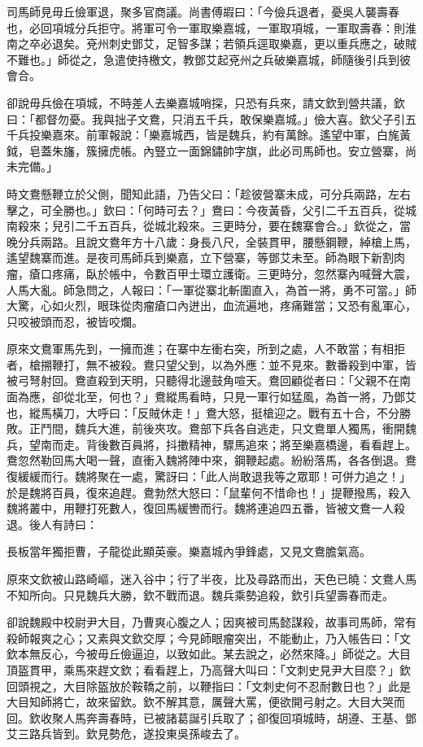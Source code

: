 司馬師見毋丘儉軍退，聚多官商議。尚書傅嘏曰：「今儉兵退者，憂吳人襲壽春也，必回項城分兵拒守。將軍可令一軍取樂嘉城，一軍取項城，一軍取壽春：則淮南之卒必退矣。兗州刺史鄧艾，足智多謀；若領兵逕取樂嘉，更以重兵應之，破賊不難也。」師從之，急遣使持檄文，教鄧艾起兗州之兵破樂嘉城，師隨後引兵到彼會合。

卻說毋兵儉在項城，不時差人去樂嘉城哨探，只恐有兵來，請文欽到營共議，欽曰：「都督勿憂。我與拙子文鴦，只消五千兵，敢保樂嘉城。」儉大喜。欽父子引五千兵投樂嘉來。前軍報說：「樂嘉城西，皆是魏兵，約有萬餘。遙望中軍，白旄黃鉞，皂蓋朱旛，簇擁虎帳。內豎立一面錦鏽帥字旗，此必司馬師也。安立營寨，尚未完備。」

時文鴦懸鞭立於父側，聞知此語，乃告父曰：「趁彼營寨未成，可分兵兩路，左右擊之，可全勝也。」欽曰：「何時可去？」鴦曰：今夜黃昏，父引二千五百兵，從城南殺來；兒引二千五百兵，從城北殺來。三更時分，要在魏寨會合。」欽從之，當晚分兵兩路。且說文鴦年方十八歲：身長八尺，全裝貫甲，腰懸鋼鞭，綽槍上馬，遙望魏寨而進。是夜司馬師兵到樂嘉，立下營寨，等鄧艾未至。師為眼下新割肉瘤，瘡口疼痛，臥於帳中，令數百甲士環立護衛。三更時分，忽然寨內喊聲大震，人馬大亂。師急問之，人報曰：「一軍從寨北斬圍直入，為首一將，勇不可當。」師大驚，心如火烈，眼珠從肉瘤瘡口內迸出，血流遍地，疼痛難當；又恐有亂軍心，只咬被頭而忍，被皆咬爛。

原來文鴦軍馬先到，一擁而進；在寨中左衝右突，所到之處，人不敢當；有相拒者，槍搠鞭打，無不被殺。鴦只望父到，以為外應：並不見來。數番殺到中軍，皆被弓弩射回。鴦直殺到天明，只聽得北邊鼓角喧天。鴦回顧從者曰：「父親不在南面為應，卻從北至，何也？」鴦縱馬看時，只見一軍行如猛風，為首一將，乃鄧艾也，縱馬橫刀，大呼曰：「反賊休走！」鴦大怒，挺槍迎之。戰有五十合，不分勝敗。正鬥間，魏兵大進，前後夾攻。鴦部下兵各自逃走，只文鴦單人獨馬，衝開魏兵，望南而走。背後數百員將，抖擻精神，驟馬追來；將至樂嘉橋邊，看看趕上。鴦忽然勒回馬大喝一聲，直衝入魏將陣中來，鋼鞭起處。紛紛落馬，各各倒退。鴦復緩緩而行。魏將聚在一處，驚訝曰：「此人尚敢退我等之眾耶！可併力追之！」於是魏將百員，復來追趕。鴦勃然大怒曰：「鼠輩何不惜命也！」提鞭撥馬，殺入魏將叢中，用鞭打死數人，復回馬緩轡而行。魏將連追四五番，皆被文鴦一人殺退。後人有詩曰：

長板當年獨拒曹，子龍從此顯英豪。樂嘉城內爭鋒處，又見文鴦膽氣高。

原來文欽被山路崎嶇，迷入谷中；行了半夜，比及尋路而出，天色已曉：文鴦人馬不知所向。只見魏兵大勝，欽不戰而退。魏兵乘勢追殺，欽引兵望壽春而走。

卻說魏殿中校尉尹大目，乃曹爽心腹之人；因爽被司馬懿謀殺，故事司馬師，常有殺師報爽之心；又素與文欽交厚；今見師眼瘤突出，不能動止，乃入帳告曰：「文欽本無反心，今被毋丘儉逼迫，以致如此。某去說之，必然來降。」師從之。大目頂盔貫甲，乘馬來趕文欽；看看趕上，乃高聲大叫曰：「文刺史見尹大目麼？」欽回頭視之，大目除盔放於鞍鞽之前，以鞭指曰：「文刺史何不忍耐數日也？」此是大目知師將亡，故來留欽。欽不解其意，厲聲大罵，便欲開弓射之。大目大哭而回。欽收聚人馬奔壽春時，已被諸葛誕引兵取了；卻復回項城時，胡遵、王基、鄧艾三路兵皆到。欽見勢危，遂投東吳孫峻去了。


